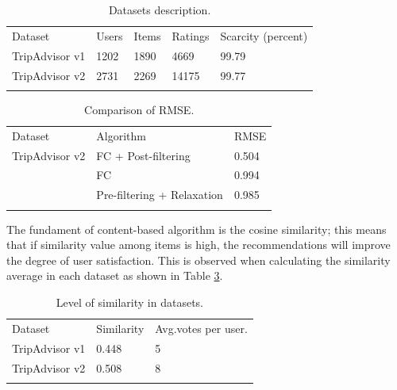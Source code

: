 \begin{table}
\centering
\caption{Datasets description.}
\label{tab:3}       %
\begin{tabular}{lllll}
\hline\noalign{\smallskip}
Dataset & Users & Items & Ratings & Scarcity (percent) \\
\noalign{\smallskip}\hline\noalign{\smallskip}
TripAdvisor v1 & 1202 & 1890 & 4669 & 99.79 \\
TripAdvisor v2 & 2731 & 2269 & 14175 & 99.77 \\
\noalign{\smallskip}\hline
\end{tabular}
\end{table}




\begin{table}
\centering
\caption{Comparison of RMSE.}
\label{tab:4}       %
\begin{tabular}{lll}
\hline\noalign{\smallskip}
Dataset & Algorithm & RMSE \\
\noalign{\smallskip}\hline\noalign{\smallskip}
TripAdvisor v2 & FC + Post-filtering  & 0.504  \\
               & FC          & 0.994  \\
               & Pre-filtering + Relaxation & 0.985  \\

\noalign{\smallskip}\hline
\end{tabular}
\end{table}


The fundament of content-based algorithm is the cosine similarity; 
this means that if similarity value among items is high, the recommendations 
will improve the degree of user satisfaction. This is observed when calculating 
the similarity average in each dataset as shown in Table \ref{tab:5}.

\begin{table}
\centering
\caption{Level of similarity in datasets. }
\label{tab:5}       %
\begin{tabular}{lll}
\hline\noalign{\smallskip}
Dataset  & Similarity  & Avg.votes per user. \\
\noalign{\smallskip}\hline\noalign{\smallskip}
TripAdvisor v1 & 0.448  & 5  \\
TripAdvisor v2 & 0.508  & 8  \\

\noalign{\smallskip}\hline
\end{tabular}
\end{table}


